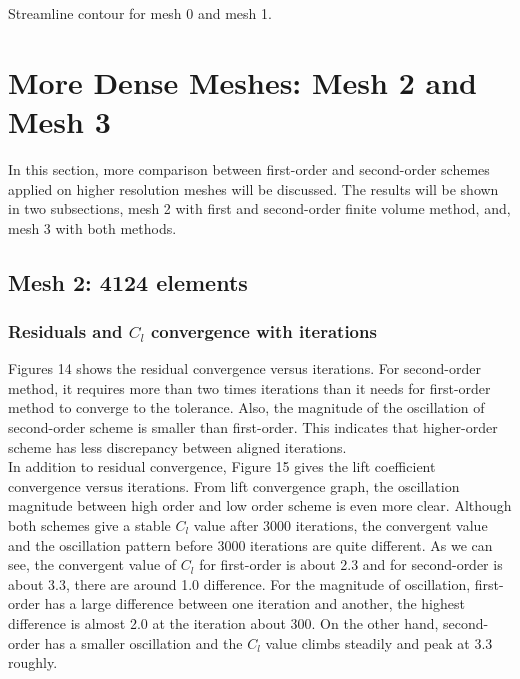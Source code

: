 \documentclass[letterpaper,onecolumn,12pt]{article}
\makeatletter
\newenvironment{figurehere}
  {\def\@captype{figure}}{}
\makeatother
\begin{document}
\begin{figurehere}
 \centering 
  \hspace{.05cm} 
  \caption{Streamline contour for mesh 0 and mesh 1.} 
\end{figurehere}


\section{More Dense Meshes: Mesh 2 and Mesh 3}
In this section, more comparison between first-order and second-order schemes applied on higher resolution meshes will be discussed. The results will be shown in two subsections, mesh 2 with first and second-order finite volume method, and, mesh 3 with both methods.

\subsection{Mesh 2: 4124 elements}

\subsubsection{Residuals and $C_l$ convergence with iterations}
Figures 14 shows the residual convergence versus iterations. For second-order method, it requires more than two times iterations than it needs for first-order method to converge to the tolerance. Also, the magnitude of the oscillation of second-order scheme is smaller than first-order. This  indicates that higher-order scheme has less discrepancy between aligned iterations.\\

In addition to residual convergence, Figure 15 gives the lift coefficient convergence versus iterations. From lift convergence graph, the oscillation magnitude between high order and low order scheme is even more clear. Although both schemes give a stable $C_l$ value after 3000 iterations, the convergent value and the oscillation pattern before 3000 iterations are quite different. As we can see, the convergent value of $C_l$ for first-order is about 2.3 and for second-order is about 3.3, there are around 1.0 difference. For the magnitude of oscillation, first-order has a large difference between one iteration and another, the highest difference is almost 2.0 at the iteration about 300. On the other hand, second-order has a smaller oscillation and the $C_l$ value climbs steadily and peak at 3.3 roughly. 
\end{document}
